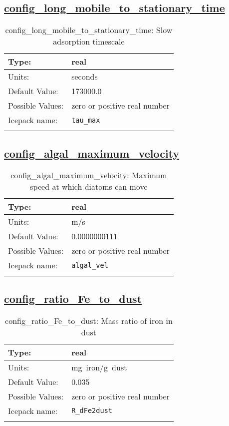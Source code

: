 \subsection[config\_long\_mobile\_to\_stationary\_time]{\hyperref[sec:nm_tab_biogeochemistry]{config\_long\_mobile\_to\_stationary\_time}}
\label{subsec:nm_sec_config_long_mobile_to_stationary_time}
\begin{center}
\begin{longtable}{| p{2.0in} || p{4.0in} |}
    \hline
    Type: & real \\
    \hline
    Units: & \si{seconds} \\
    \hline
    Default Value: & 173000.0 \\
    \hline
    Possible Values: & zero or positive real number \\
    \hline
    Icepack name: & \verb+tau_max+ \\
    \hline
    \caption{config\_long\_mobile\_to\_stationary\_time: Slow adsorption timescale}
\end{longtable}
\end{center}
\subsection[config\_algal\_maximum\_velocity]{\hyperref[sec:nm_tab_biogeochemistry]{config\_algal\_maximum\_velocity}}
\label{subsec:nm_sec_config_algal_maximum_velocity}
\begin{center}
\begin{longtable}{| p{2.0in} || p{4.0in} |}
    \hline
    Type: & real \\
    \hline
    Units: & \si{m/s} \\
    \hline
    Default Value: & 0.0000000111 \\
    \hline
    Possible Values: & zero or positive real number  \\
    \hline
    Icepack name: & \verb+algal_vel+ \\
    \hline
    \caption{config\_algal\_maximum\_velocity: Maximum speed at which diatoms can move}
\end{longtable}
\end{center}
\subsection[config\_ratio\_Fe\_to\_dust]{\hyperref[sec:nm_tab_biogeochemistry]{config\_ratio\_Fe\_to\_dust}}
\label{subsec:nm_sec_config_ratio_Fe_to_dust}
\begin{center}
\begin{longtable}{| p{2.0in} || p{4.0in} |}
    \hline
    Type: & real \\
    \hline
    Units: & \si{mg.iron/g.dust} \\
    \hline
    Default Value: & 0.035 \\
    \hline
    Possible Values: & zero or positive real number \\
    \hline
    Icepack name: & \verb+R_dFe2dust+ \\
    \hline
    \caption{config\_ratio\_Fe\_to\_dust: Mass ratio of iron in dust}
\end{longtable}
\end{center}
